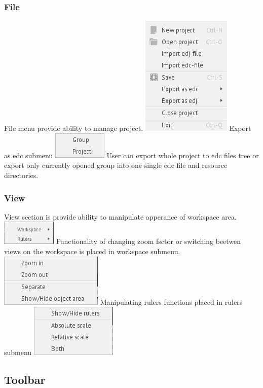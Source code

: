 \documentclass[titlepage,oneside,11pt]{book}
\begin{document}
\subsubsection{File}
File menu provide ability to manage project. 
\includegraphics{images/file_menu.png}
Export as edc submenu
\includegraphics{images/file_export_as_edc_submenu.png}
User can export whole project to edc files tree or export only currently opened group into one single edc file and resource directories.
\subsubsection{View}
View section is provide ability to manipulate apperance of workspace area.
\includegraphics{images/view_menu.png}
Functionality of changing zoom fsctor or switching beetwen views on the workspace is placed in workspace submenu.
\includegraphics{images/view_workspace_submenu.png}
Manipulating rulers functions placed in rulers submenu
\includegraphics{images/view_rulers_submenu.png}
\subsection{Toolbar}
\end{document}
